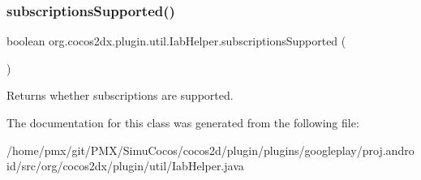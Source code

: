 \subsubsection{\texorpdfstring{subscriptions\+Supported()}{subscriptionsSupported()}}
{\footnotesize\ttfamily boolean org.\+cocos2dx.\+plugin.\+util.\+Iab\+Helper.\+subscriptions\+Supported (\begin{DoxyParamCaption}{ }\end{DoxyParamCaption})\hspace{0.3cm}{\ttfamily [inline]}}

Returns whether subscriptions are supported. 

The documentation for this class was generated from the following file\+:\begin{DoxyCompactItemize}
\item 
/home/pmx/git/\+P\+M\+X/\+Simu\+Cocos/cocos2d/plugin/plugins/googleplay/proj.\+android/src/org/cocos2dx/plugin/util/Iab\+Helper.\+java\end{DoxyCompactItemize}
